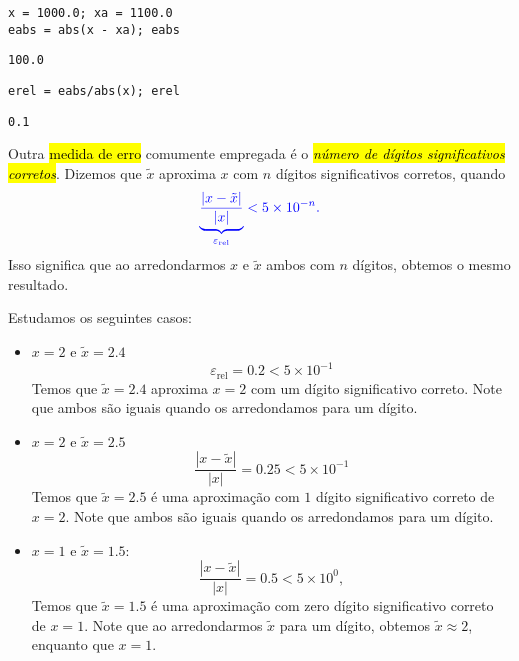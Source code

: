\begin{ex}
\begin{enumerate}[a)]
\begin{lstlisting}
x = 1000.0; xa = 1100.0
eabs = abs(x - xa); eabs
\end{lstlisting}

\begin{verbatim}
100.0
\end{verbatim}

\begin{lstlisting}
erel = eabs/abs(x); erel
\end{lstlisting}

\begin{verbatim}
0.1
\end{verbatim}
    
  \end{enumerate}
\end{ex}

Outra \hl{medida de erro} comumente empregada é o \hl{\emph{número de dígitos significativos corretos}}. Dizemos que $\tilde{x}$ aproxima $x$ com $n$ dígitos significativos corretos, quando
\begin{equation}
  \color{blue}\underbrace{\frac{|x - \tilde{x}|}{|x|}}_{\varepsilon_{\text{rel}}} < 5\times 10^{-n}.
\end{equation}
Isso significa que ao arredondarmos $x$ e $\tilde{x}$ ambos com $n$ dígitos, obtemos o mesmo resultado.

\begin{ex}\label{ex:numdigsigcorr}
  Estudamos os seguintes casos:
  \begin{itemize}
  \item $x=2$ e $\tilde{x} = 2.4$
    \begin{equation}
      \varepsilon_{\text{rel}} = 0.2 < 5\times 10^{-1}
    \end{equation}
    Temos que $\tilde{x} = 2.4$ aproxima $x = 2$ com um dígito significativo correto. Note que ambos são iguais quando os arredondamos para um dígito.
  \item $x=2$ e $\tilde{x} = 2.5$
    \begin{equation}
      \frac{|x - \tilde{x}|}{|x|} = 0.25 < 5\times 10^{-1}
    \end{equation}
    Temos que $\tilde{x}=2.5$ é uma aproximação com $1$ dígito significativo correto de $x=2$. Note que ambos são iguais quando os arredondamos para um dígito.
  \item $x=1$ e $\tilde{x} = 1.5$:
    \begin{equation}
      \frac{|x - \tilde{x}|}{|x|} = 0.5 < 5\times 10^{0},
    \end{equation}
    Temos que $\tilde{x}=1.5$ é uma aproximação com zero dígito significativo correto de $x=1$. Note que ao arredondarmos $\tilde{x}$ para um dígito, obtemos $\tilde{x}\approx 2$, enquanto que $x=1$.
  \end{itemize}
\end{ex}

